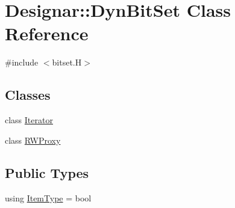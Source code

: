 \hypertarget{class_designar_1_1_dyn_bit_set}{}\section{Designar\+:\+:Dyn\+Bit\+Set Class Reference}
\label{class_designar_1_1_dyn_bit_set}


{\ttfamily \#include $<$bitset.\+H$>$}

\subsection*{Classes}
\begin{DoxyCompactItemize}
\item 
class \hyperlink{class_designar_1_1_dyn_bit_set_1_1_iterator}{Iterator}
\item 
class \hyperlink{class_designar_1_1_dyn_bit_set_1_1_r_w_proxy}{R\+W\+Proxy}
\end{DoxyCompactItemize}
\subsection*{Public Types}
\begin{DoxyCompactItemize}
\item 
using \hyperlink{class_designar_1_1_dyn_bit_set_ad3f66987966a4fc27fec6d6ab552a1c7}{Item\+Type} = bool
\end{DoxyCompactItemize}
